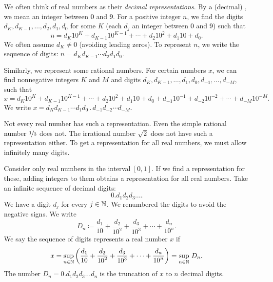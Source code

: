 We often think of real numbers as their
\emph{decimal representations}.
By a (decimal)
\emph{}, we mean an integer
between $0$ and $9$.
For a positive integer $n$, we find the digits $d_K,d_{K-1},\ldots,d_2,d_1,d_0$ for some
$K$ (each $d_j$ an integer between $0$ and $9$) such that
\begin{equation*}
n = d_K {10}^K + d_{K-1} {10}^{K-1} + \cdots + d_2 {10}^2 + d_1 10 + d_0 .
\end{equation*}
We often assume $d_K \neq 0$ (avoiding leading zeros).
To represent $n$, we write the sequence of
digits: $n = d_K d_{K-1} \cdots d_2 d_1 d_0$.

Similarly, we
represent some rational numbers.  For certain
numbers $x$, we can find
nonnegative integers $K$ and $M$ and digits
$d_K,d_{K-1},\ldots,d_1,d_0,d_{-1},\ldots,d_{-M}$, such that
\begin{equation*}
x
= d_K {10}^K + d_{K-1} {10}^{K-1} + \cdots + d_2 {10}^2 + d_1 10 + d_0
+ d_{-1} {10}^{-1} + d_{-2} {10}^{-2} + \cdots + d_{-M} {10}^{-M} .
\end{equation*}
We write $x = d_K d_{K-1} \cdots d_1 d_0 \, . \, d_{-1} d_{-2} \cdots d_{-M}$.

Not every real number has such a representation.
Even the simple
rational number $\nicefrac{1}{3}$ does not.  The irrational number $\sqrt{2}$
does not have such a representation either.  To get a representation for
all real numbers, we must allow infinitely many digits.

Consider only real numbers in the interval $[0,1]$.  If
we find a representation for these, adding
integers to them obtains a representation for all real numbers.
Take an infinite sequence of decimal digits:
\begin{equation*}
0.d_1d_2d_3\ldots.
\end{equation*}
We have a digit $d_j$ for every $j \in {\mathbb{N}}$.
We renumbered the digits to avoid the negative signs.
We write
\begin{equation*}
D_n \coloneqq
\frac{d_1}{10} +
\frac{d_2}{{10}^2} +
\frac{d_3}{{10}^3} +
\cdots +
\frac{d_n}{{10}^n} .
\end{equation*}
We say the
sequence of digits represents a real number $x$ if
\begin{equation*}
x =
\sup_{n \in {\mathbb{N}}} \left(
\frac{d_1}{10} +
\frac{d_2}{{10}^2} +
\frac{d_3}{{10}^3} +
\cdots +
\frac{d_n}{{10}^n}
\right) =
\sup_{n \in {\mathbb{N}}} \, D_n .
\end{equation*}
The number $D_n=0.d_1 d_2 d_3 \ldots d_n$ is the truncation of $x$
to $n$ decimal digits.

